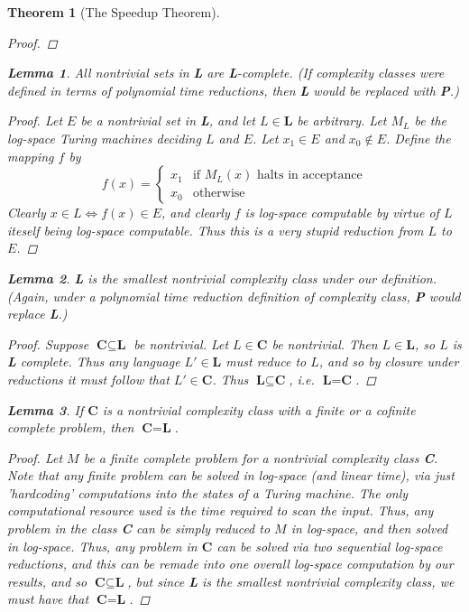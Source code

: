 \documentclass{article}
\theoremstyle{definition}
\theoremstyle{plain}
\theoremstyle{theorem}
\newtheorem{lemma}{Lemma}[section]
\newtheorem{theorem}{Theorem}[section]
\begin{document}
\begin{theorem}[The Speedup Theorem]
\begin{proof}
\end{proof}
\begin{lemma}
	All nontrivial sets in \textbf{L} are \textbf{L}-complete. (If complexity classes were defined in terms of polynomial time reductions, then \textbf{L} would be replaced with \textbf{P}.)
\end{lemma}
\begin{proof}
	Let $E$ be a nontrivial set in \textbf{L}, and let $L \in \textbf{L}$ be arbitrary. Let $M_L$ be the log-space Turing machines deciding $L$ and $E$. Let $x_1 \in E$ and $x_0 \notin E$. Define the mapping $f$ by
	\[ f(x) = \begin{cases}
			  	x_1 & \textrm{if $M_L(x)$ halts in acceptance} \\
			  	x_0 & \textrm{otherwise}
			  \end{cases} \] 
Clearly $x \in L \iff f(x) \in E$, and clearly $f$ is log-space computable by virtue of $L$ iteself being log-space computable. Thus this is a very stupid reduction from $L$ to $E$. 
\end{proof}
\begin{lemma}
	\textbf{L} is the smallest nontrivial complexity class under our definition. (Again, under a polynomial time reduction definition of complexity class, \textbf{P} would replace \textbf{L}.)
\end{lemma}
\begin{proof}
	Suppose $\textbf{C} \subseteq \textbf{L}$ be nontrivial. Let $L \in \textbf{C}$ be nontrivial. Then $L \in \textbf{L}$, so $L$ is \textbf{L} complete. Thus any language $L' \in \textbf{L}$ must reduce to $L$, and so by closure under reductions it must follow that $L' \in \textbf{C}$. Thus $\textbf{L} \subseteq \textbf{C}$, i.e. $\textbf{L} = \textbf{C}$.
\end{proof}
\begin{lemma}
 If $\textbf{C}$ is a nontrivial complexity class with a finite or a cofinite complete problem, then $\textbf{C} = \textbf{L}$. 
\end{lemma}
\begin{proof}
	Let $M$ be a finite complete problem for a nontrivial complexity class \textbf{C}. Note that any finite problem can be solved in log-space (and linear time), via just 'hardcoding' computations into the states of a Turing machine. The only computational resource used is the time required to scan the input. Thus, any problem in the class \textbf{C} can be simply reduced to $M$ in log-space, and then solved in log-space. Thus, any problem in $\textbf{C}$ can be solved via two sequential log-space reductions, and this can be remade into one overall log-space computation by our results, and so $\textbf{C} \subseteq \textbf{L}$, but since \textbf{L} is the smallest nontrivial complexity class, we must have that $\textbf{C} = \textbf{L}$.

\end{proof}
\end{theorem}
\end{document}
